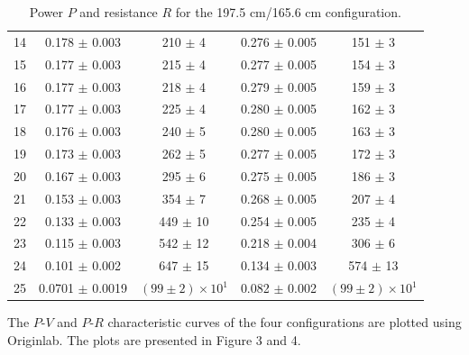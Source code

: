 \documentclass{article}
\begin{document}
{\begin{table}[H]
\begin{tabular}{ccc||cc}
        14 & 0.178   $\pm$ 0.003            & 210                $\pm$ 4   & 0.276   $\pm$ 0.005  & 151                $\pm$ 3   \\
        15 & 0.177   $\pm$ 0.003            & 215                $\pm$ 4   & 0.277   $\pm$ 0.005  & 154                $\pm$ 3   \\
        16 & 0.177   $\pm$ 0.003            & 218                $\pm$ 4   & 0.279   $\pm$ 0.005  & 159                $\pm$ 3   \\
        17 & 0.177   $\pm$ 0.003            & 225                $\pm$ 4   & 0.280   $\pm$ 0.005  & 162                $\pm$ 3   \\
        18 & 0.176   $\pm$ 0.003            & 240                $\pm$ 5   & 0.280   $\pm$ 0.005  & 163                $\pm$ 3   \\
        19 & 0.173   $\pm$ 0.003            & 262                $\pm$ 5   & 0.277   $\pm$ 0.005  & 172                $\pm$ 3   \\
        20 & 0.167   $\pm$ 0.003            & 295                $\pm$ 6   & 0.275   $\pm$ 0.005  & 186                $\pm$ 3   \\
        21 & 0.153   $\pm$ 0.003            & 354                $\pm$ 7   & 0.268   $\pm$ 0.005  & 207                $\pm$ 4   \\
        22 & 0.133   $\pm$ 0.003            & 449                $\pm$ 10  & 0.254   $\pm$ 0.005  & 235                $\pm$ 4   \\
        23 & 0.115   $\pm$ 0.003            & 542                $\pm$ 12  & 0.218   $\pm$ 0.004  & 306                $\pm$ 6   \\
        24 & 0.101   $\pm$ 0.002            & 647                $\pm$ 15  & 0.134   $\pm$ 0.003  & 574                $\pm$ 13  \\
        25 & 0.0701  $\pm$ 0.0019           & $(99\pm 2)\times 10^{1}$     & 0.082   $\pm$ 0.002  & $(99\pm 2)\times 10^{1}$     \\
        \bottomrule
    \end{tabular}
    \caption{Power $P$ and resistance $R$ for the 197.5 cm/165.6 cm configuration.}\label{TablePRSP}
\end{table}

The $P$-$V$ and $P$-$R$ characteristic curves of the four configurations are plotted using Originlab. The plots are presented in Figure 3 and 4.

}
\end{document}
